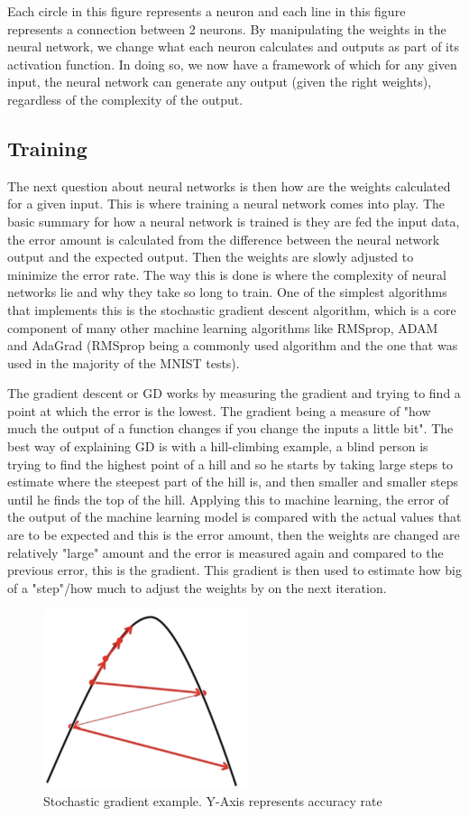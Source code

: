 \documentclass[a4paper,oneside,phd,etd]{BYUPhys}
\begin{document}
Each circle in this figure represents a neuron and each line in this figure represents a connection between 2 neurons. By manipulating the weights in the neural network, we change what each neuron calculates and outputs as part of its activation function. In doing so, we now have a framework of which for any given input, the neural network can generate any output (given the right weights), regardless of the complexity of the output\cite{nielsen}. 

\subsection{Training}
The next question about neural networks is then how are the weights calculated for a given input. This is where training a neural network comes into play. The basic summary for how a neural network is trained is they are fed the input data, the error amount is calculated from the difference between the neural network output and the expected output. Then the weights are slowly adjusted to minimize the error rate. The way this is done is where the complexity of neural networks lie and why they take so long to train. One of the simplest algorithms that implements this is the stochastic gradient descent algorithm, which is a core component of many other machine learning algorithms like RMSprop, ADAM and AdaGrad (RMSprop being a commonly used algorithm and the one that was used in the majority of the MNIST tests). 

The gradient descent or GD works by measuring the gradient and trying to find a point at which the error is the lowest. The gradient being a measure of "how much the output of a function changes if you change the inputs a little bit"\cite{towards-data-science}.
The best way of explaining GD is with a hill-climbing example, a blind person is trying to find the highest point of a hill and so he starts by taking large steps to estimate where the steepest part of the hill is, and then smaller and smaller steps until he finds the top of the hill. Applying this to machine learning, the error of the output of the machine learning model is compared with the actual values that are to be expected and this is the error amount, then the weights are changed are relatively "large" amount and the error is measured again and compared to the previous error, this is the gradient. This gradient is then used to estimate how big of a "step"/how much to adjust the weights by on the next iteration.
\begin{figure}[H]
\centering
\includegraphics[width=6cm]{pictures/gradient.png}
\caption{Stochastic gradient example.
Y-Axis represents accuracy rate}
\label{fig:gradient}
\end{figure}
\end{document}
